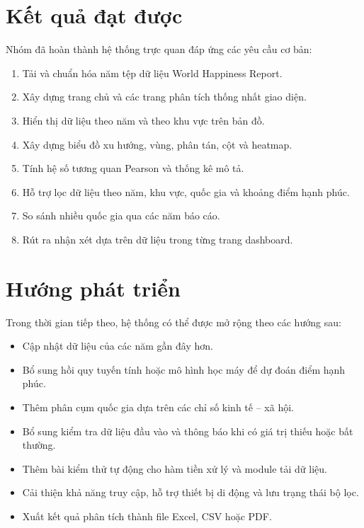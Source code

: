 \section{Kết quả đạt được}

Nhóm đã hoàn thành hệ thống trực quan đáp ứng các yêu cầu cơ bản:

\begin{enumerate}
    \item Tải và chuẩn hóa năm tệp dữ liệu World Happiness Report.
    \item Xây dựng trang chủ và các trang phân tích thống nhất giao diện.
    \item Hiển thị dữ liệu theo năm và theo khu vực trên bản đồ.
    \item Xây dựng biểu đồ xu hướng, vùng, phân tán, cột và heatmap.
    \item Tính hệ số tương quan Pearson và thống kê mô tả.
    \item Hỗ trợ lọc dữ liệu theo năm, khu vực, quốc gia và khoảng điểm hạnh phúc.
    \item So sánh nhiều quốc gia qua các năm báo cáo.
    \item Rút ra nhận xét dựa trên dữ liệu trong từng trang dashboard.
\end{enumerate}

\section{Hướng phát triển}

Trong thời gian tiếp theo, hệ thống có thể được mở rộng theo các hướng sau:

\begin{itemize}
    \item Cập nhật dữ liệu của các năm gần đây hơn.
    \item Bổ sung hồi quy tuyến tính hoặc mô hình học máy để dự đoán điểm hạnh phúc.
    \item Thêm phân cụm quốc gia dựa trên các chỉ số kinh tế -- xã hội.
    \item Bổ sung kiểm tra dữ liệu đầu vào và thông báo khi có giá trị thiếu hoặc bất thường.
    \item Thêm bài kiểm thử tự động cho hàm tiền xử lý và module tải dữ liệu.
    \item Cải thiện khả năng truy cập, hỗ trợ thiết bị di động và lưu trạng thái bộ lọc.
    \item Xuất kết quả phân tích thành file Excel, CSV hoặc PDF.
\end{itemize}

